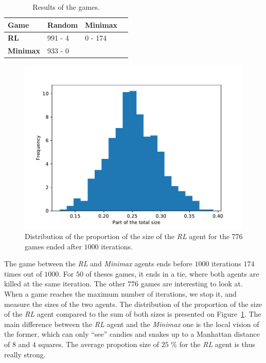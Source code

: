 \documentclass[journal, a4paper]{IEEEtran}
\begin{document}
\begin{table}[h]
	\caption{\label{comparative_table}Results of the games.}
	\centering
	\begin{tabular}{llll}
		\hline
        \textbf{Game} & \textbf{Random} & \textbf{Minimax}  \\
		\hline
        \textbf{RL} & 991 - 4 & 0 - 174 \\
        \textbf{Minimax} & 933 - 0 &  \\
		\hline
	\end{tabular}
\end{table}

\begin{figure}[h]
	\centering
    \includegraphics[width=0.95\columnwidth]{images/histo_size.pdf}
    \caption{\label{histo_size}Distribution of the proportion of the size of the \emph{RL} agent for the $776$ games ended after $1000$ iterations.}
\end{figure}

The game between the \emph{RL} and \emph{Minimax} agents ends before $1000$ iterations $174$ times out of $1000$.
For $50$ of theses games, it ends in a tie, where both agents are killed at the same iteration.
The other $776$ games are interesting to look at.
When a game reaches the maximum number of iterations, we stop it, and measure the sizes of the two agents.
The distribution of the proportion of the size of the \emph{RL} agent compared to the sum of both sizes is presented on Figure~\ref{histo_size}.
The main difference between the \emph{RL} agent and the \emph{Minimax} one is the local vision of the former, which can only ``see'' candies and snakes up to a Manhattan distance of $8$ and $4$ squares.
The average propotion size of $25$ \% for the \emph{RL} agent is thus really strong.
\end{document}
